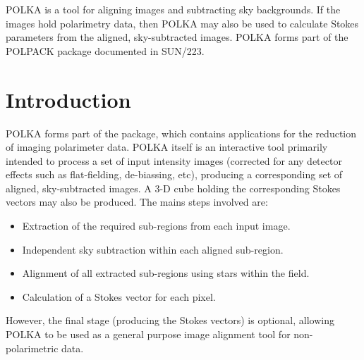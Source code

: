 
POLKA is a tool for aligning images and subtracting sky backgrounds. If
the images hold polarimetry data, then POLKA may also be used to
calculate Stokes parameters from the aligned, sky-subtracted images.
POLKA forms part of the POLPACK package documented in SUN/223.

 \newpage
 \begin{latexonly}
   \setlength{\parskip}{0mm}
   \latexonlytoc
   \setlength{\parskip}{\medskipamount}
   \markright{\stardocname}
 \end{latexonly}
\newpage
\renewcommand{\thepage}{\arabic{page}}
\setcounter{page}{1}

\section {Introduction}
POLKA forms part of the  package, which contains
applications for the reduction of imaging polarimeter data. POLKA itself
is an interactive tool primarily intended to process a set of input
intensity images (corrected for any detector effects such as
flat-fielding, de-biassing, etc), producing a corresponding set of
aligned, sky-subtracted images. A 3-D cube holding the corresponding
Stokes vectors may also be produced. The mains steps involved are:

\begin{itemize}
\item Extraction of the required sub-regions from each input image.
\item Independent sky subtraction within each aligned sub-region.
\item Alignment of all extracted sub-regions using stars within the field.
\item Calculation of a Stokes vector for each pixel.
\end{itemize}

However, the final stage (producing the Stokes vectors) is optional,
allowing POLKA to be used as a general purpose image alignment tool for
non-polarimetric data.

